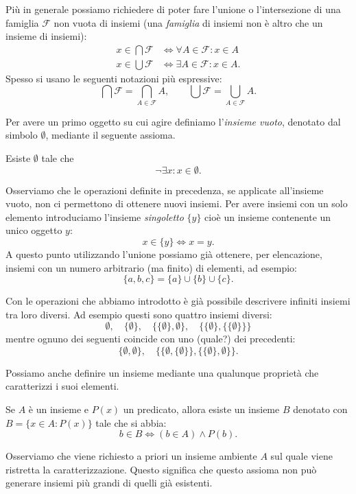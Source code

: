 \documentclass[italian,a4paper,hidelinks,headinclude]{scrartcl}
\newcommand{\F}{{\mathcal F}}
\newcommand{\myemph}[1]{\emph{#1}\marginpar{#1}}
\begin{document}
Più in generale possiamo richiedere di poter fare l'unione o l'intersezione
di una famiglia $\F$ non vuota di insiemi (una \emph{famiglia} di insiemi non è altro che un insieme di insiemi):
\begin{align*}
  x \in \bigcap \F &\iff \forall A \in \F\colon x \in A \\
  x \in \bigcup \F &\iff \exists A \in \F\colon x \in A.
\end{align*}
Spesso si usano le seguenti notazioni più espressive:
\[
 \bigcap \F = \bigcap_{A \in \F} A,\qquad
 \bigcup \F = \bigcup_{A \in \F} A.
\]

Per avere un primo oggetto su cui agire definiamo l'\myemph{insieme vuoto},
denotato
dal simbolo $\emptyset$, mediante il seguente assioma.

\begin{axiom}
Esiste $\emptyset$ tale che
\[
\neg \exists x \colon x \in \emptyset.
\]
\end{axiom}

Osserviamo che le operazioni definite in precedenza, se applicate all'insieme vuoto,
non ci permettono di ottenere nuovi insiemi.
Per avere insiemi con un solo elemento introduciamo l'insieme \myemph{singoletto}
$\{ y \}$ cioè un insieme contenente un unico oggetto $y$:
\[
  x \in \{ y \} \iff x = y.
\]
A questo punto utilizzando l'unione possiamo già ottenere,
per elencazione,
insiemi con un numero
arbitrario (ma finito) di elementi, ad esempio:
\[
  \{a, b, c\} = \{ a \} \cup \{ b\} \cup \{c\}.
\]

Con le operazioni che abbiamo introdotto è già possibile descrivere infiniti insiemi
tra loro diversi. Ad esempio questi sono quattro insiemi diversi:
\[
 \emptyset,\quad
 \{ \emptyset \},\quad
 \{\{\emptyset\}, \emptyset\},\quad
 \{\{\emptyset\}, \{\{\emptyset\}\}\}
\]
mentre ognuno dei seguenti coincide con uno (quale?) dei precedenti:
\[
 \{\emptyset, \emptyset\},\quad
 \{\{\emptyset, \{\emptyset\}\}, \{\{\emptyset\}, \emptyset\}\}.
\]

Possiamo anche definire un insieme mediante una qualunque
proprietà che caratterizzi
i suoi elementi.

\begin{axiom}[specificazione]
Se $A$ è un insieme e $P(x)$ un predicato, allora
esiste un insieme $B$ denotato con $B = \{x\in A\colon P(x)\}$ tale
che si abbia:
\[
  b \in B \iff (b \in A) \wedge P(b).
\]
\end{axiom}

Osserviamo che viene richiesto a priori un insieme ambiente $A$ sul quale
viene ristretta la caratterizzazione. Questo significa che questo assioma non
può generare insiemi più grandi di quelli già esistenti.
\end{document}

